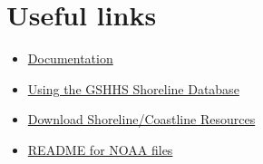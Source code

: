 \section{Useful links}

\begin{itemize}
    \item[\faExternalLink] \href{http://www.medslik-ii.org/users/version_2_0_1.php}{Documentation}
    \item[\faExternalLink] \href{http://www.idlcoyote.com/map_tips/gshhs.html}{Using the GSHHS Shoreline Database}
    \item[\faExternalLink]     \href{https://www.ngdc.noaa.gov/mgg/shorelines/gshhs.html}{Download Shoreline/Coastline Resources}
    \item[\faExternalLink] \href{https://www.ngdc.noaa.gov/mgg/shorelines/data/gshhg/latest/readme.txt}{README for NOAA files}
\end{itemize}